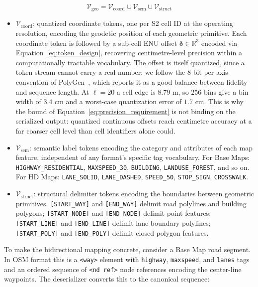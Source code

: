 \documentclass{book}
\begin{document}
\begin{equation}
  \mathcal{V}_{\text{geo}} =
    \mathcal{V}_{\text{coord}}
    \cup \mathcal{V}_{\text{sem}}
    \cup \mathcal{V}_{\text{struct}}
  \label{eq:vocab}
\end{equation}

\begin{itemize}
\item $\mathcal{V}_{\text{coord}}$: quantized coordinate
  tokens, one per S2 cell ID at the operating resolution,
  encoding the geodetic position of each geometric primitive.
  Each coordinate token is followed by a sub-cell ENU offset
  $\boldsymbol{\delta} \in \mathbb{R}^3$ encoded via
  Equation~\eqref{eq:token_design}, recovering centimetre-level
  precision within a computationally tractable vocabulary.
  The offset is itself quantized, since a token stream cannot
  carry a real number: we follow the 8-bit-per-axis convention
  of PolyGen~\cite{nash2020polygen}, which reports it as a good
  balance between fidelity and sequence length.  At $\ell = 20$
  a cell edge is $8.79$ m, so $256$ bins give a bin width of
  $3.4$ cm and a worst-case quantization error of $1.7$ cm.
  This is why the bound of
  Equation~\eqref{eq:precision_requirement} is not binding on
  the serialized output: quantized continuous offsets reach
  centimetre accuracy at a far coarser cell level than cell
  identifiers alone could.

\item $\mathcal{V}_{\text{sem}}$: semantic label tokens
  encoding the category and attributes of each map feature,
  independent of any format's specific tag vocabulary.  For
  Base Maps: \texttt{HIGHWAY\_RESIDENTIAL},
  \texttt{MAXSPEED\_30}, \texttt{BUILDING},
  \texttt{LANDUSE\_FOREST}, and so on.  For HD Maps:
  \texttt{LANE\_SOLID}, \texttt{LANE\_DASHED},
  \texttt{SPEED\_50}, \texttt{STOP\_SIGN},
  \texttt{CROSSWALK}.

\item $\mathcal{V}_{\text{struct}}$: structural delimiter
  tokens encoding the boundaries between geometric
  primitives.  \texttt{[START\_WAY]} and \texttt{[END\_WAY]}
  delimit road polylines and building polygons;
  \texttt{[START\_NODE]} and \texttt{[END\_NODE]} delimit
  point features; \texttt{[START\_LINE]} and
  \texttt{[END\_LINE]} delimit lane boundary polylines;
  \texttt{[START\_POLY]} and \texttt{[END\_POLY]} delimit
  closed polygon features.
\end{itemize}

To make the bidirectional mapping concrete, consider a Base
Map road segment.  In OSM format this is a \texttt{<way>}
element with \texttt{highway}, \texttt{maxspeed}, and
\texttt{lanes} tags and an ordered sequence of
\texttt{<nd ref>} node references encoding the center-line
waypoints.  The deserializer converts this to the canonical
sequence:
\end{document}
